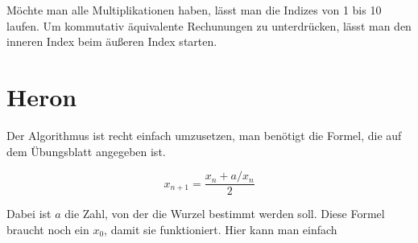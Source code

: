 \documentclass[12pt]{report}
\begin{document}
Möchte man alle Multiplikationen haben, lässt man die Indizes von 1 bis 10 laufen. Um kommutativ äquivalente Rechunungen zu unterdrücken, lässt man den inneren Index beim äußeren Index starten.

\section{Heron}

Der Algorithmus ist recht einfach umzusetzen, man benötigt die Formel, die auf dem Übungsblatt angegeben ist.

\begin{equation}
x_{n+1}=\frac{x_n+a/x_n}{2}
\end{equation}

Dabei ist $a$ die Zahl, von der die Wurzel bestimmt werden soll. Diese Formel braucht noch ein $x_0$, damit sie funktioniert. Hier kann man einfach 




\end{document}
